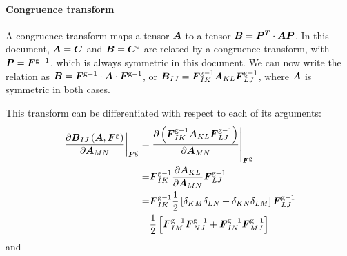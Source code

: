 \documentclass[10pt,letterpaper,oneside]{report}
\newcommand{\ten}[1]{\mbox{\boldmath $#1$}{}}
\newcommand{\scas}[1]{\mbox{{\scriptsize{${\rm{#1}}$}}}{}}
\newcommand{\tens}[1]{\mbox{\boldmath{\scriptsize{$#1$}}}{}}
\begin{document}
\paragraph{Congruence transform}
A congruence transform maps a tensor $\ten{A}$ to a tensor $\ten{B} = \ten{P}^T \cdot \ten{A} \ten{P}$.  
In this document, $\ten{A} = \ten{C}$ and $\ten{B} = \ten{C}^{\scas{e}}$ are related by a congruence transform, with $\ten{P} = \ten{F}^{\scas{g}-1}$, which is always symmetric in this document.
We can now write the relation as 
$\ten{B} = \ten{F}^{\scas{g}-1} \cdot \ten{A} \cdot \ten{F}^{\scas{g}-1}$, or 
$\ten{B}_{IJ} = \ten{F}^{\scas{g}-1}_{IK} \ten{A}_{KL} \ten{F}^{\scas{g}-1}_{LJ}$, 
where $\ten{A}$ is symmetric in both cases.

This transform can be differentiated with respect to each of its arguments:
\begin{align}
\left. \frac{\partial \ten{B}_{IJ} \left(\ten{A}, \ten{F}^{\scas{g}} \right)}{\partial \ten{A}_{MN}} \right|_{\tens{F}^{\scas{g}}} 
=& \left. \frac{\partial \left( \ten{F}^{\scas{g}-1}_{IK} \ten{A}_{KL} \ten{F}^{\scas{g}-1}_{LJ} \right)}{\partial \ten{A}_{MN} } \right|_{\tens{F}^{\scas{g}}} 
\notag \\
=& \ten{F}^{\scas{g}-1}_{IK} \frac{\partial \ten{A}_{KL} }{\partial \ten{A}_{MN} } \ten{F}^{\scas{g}-1}_{LJ} 
\notag \\
=& \ten{F}^{\scas{g}-1}_{IK} \frac{1}{2} \left[ \delta_{KM} \delta_{LN} + \delta_{KN} \delta_{LM} \right] \ten{F}^{\scas{g}-1}_{LJ} 
\notag \\
=& \frac{1}{2} \left[ \ten{F}^{\scas{g}-1}_{IM} \ten{F}^{\scas{g}-1}_{NJ} + \ten{F}^{\scas{g}-1}_{IN} \ten{F}^{\scas{g}-1}_{MJ} \right] 
\label{congruenceA}
\end{align}
and 
\end{document}
